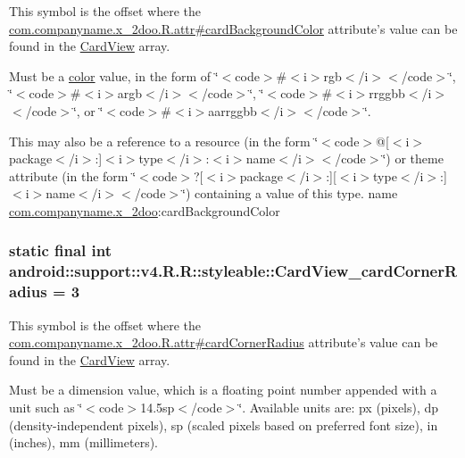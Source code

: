 This symbol is the offset where the \hyperlink{classcom_1_1companyname_1_1x__2doo_1_1_r_1_1attr_3fd3e2c97aeb495a2a084f7fa4bb1d51}{com.companyname.x\_\-2doo.R.attr\#cardBackgroundColor} attribute's value can be found in the \hyperlink{classandroid_1_1support_1_1v4_1_1_r_1_1styleable_4fcc6453aa91deadd7072add3aee5e56}{CardView} array.

Must be a \hyperlink{classandroid_1_1support_1_1v4_1_1_r_1_1color}{color} value, in the form of \char`\"{}$<$code$>$\#$<$i$>$rgb$<$/i$>$$<$/code$>$\char`\"{}, \char`\"{}$<$code$>$\#$<$i$>$argb$<$/i$>$$<$/code$>$\char`\"{}, \char`\"{}$<$code$>$\#$<$i$>$rrggbb$<$/i$>$$<$/code$>$\char`\"{}, or \char`\"{}$<$code$>$\#$<$i$>$aarrggbb$<$/i$>$$<$/code$>$\char`\"{}. 

This may also be a reference to a resource (in the form \char`\"{}$<$code$>$@\mbox{[}$<$i$>$package$<$/i$>$:\mbox{]}$<$i$>$type$<$/i$>$:$<$i$>$name$<$/i$>$$<$/code$>$\char`\"{}) or theme attribute (in the form \char`\"{}$<$code$>$?\mbox{[}$<$i$>$package$<$/i$>$:\mbox{]}\mbox{[}$<$i$>$type$<$/i$>$:\mbox{]}$<$i$>$name$<$/i$>$$<$/code$>$\char`\"{}) containing a value of this type.  name \hyperlink{namespacecom_1_1companyname_1_1x__2doo}{com.companyname.x\_\-2doo}:cardBackgroundColor \hypertarget{classandroid_1_1support_1_1v4_1_1_r_1_1styleable_aac33a30bef514283621969faf8acce1}{
\subsubsection[{CardView\_\-cardCornerRadius}]{\setlength{\rightskip}{0pt plus 5cm}static final int android::support::v4.R.R::styleable::CardView\_\-cardCornerRadius = 3}}
\label{classandroid_1_1support_1_1v4_1_1_r_1_1styleable_aac33a30bef514283621969faf8acce1}


This symbol is the offset where the \hyperlink{classcom_1_1companyname_1_1x__2doo_1_1_r_1_1attr_3782edf0ca4ffd7646880e53305c3a2e}{com.companyname.x\_\-2doo.R.attr\#cardCornerRadius} attribute's value can be found in the \hyperlink{classandroid_1_1support_1_1v4_1_1_r_1_1styleable_4fcc6453aa91deadd7072add3aee5e56}{CardView} array.

Must be a dimension value, which is a floating point number appended with a unit such as \char`\"{}$<$code$>$14.5sp$<$/code$>$\char`\"{}. Available units are: px (pixels), dp (density-independent pixels), sp (scaled pixels based on preferred font size), in (inches), mm (millimeters). 

